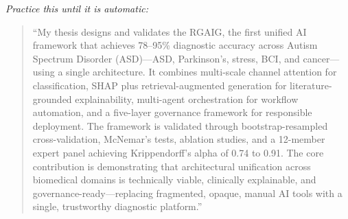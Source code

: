 \noindent\textit{Practice this until it is automatic:}

\begin{quote}
``My thesis designs and validates the RGAIG, the first unified AI framework that achieves 78--95\% diagnostic accuracy across Autism Spectrum Disorder (ASD)---ASD, Parkinson's, stress, BCI, and cancer---using a single architecture. It combines multi-scale channel attention for classification, SHAP plus retrieval-augmented generation for literature-grounded explainability, multi-agent orchestration for workflow automation, and a five-layer governance framework for responsible deployment. The framework is validated through bootstrap-resampled cross-validation, McNemar's tests, ablation studies, and a 12-member expert panel achieving Krippendorff's alpha of 0.74 to 0.91. The core contribution is demonstrating that architectural unification across biomedical domains is technically viable, clinically explainable, and governance-ready---replacing fragmented, opaque, manual AI tools with a single, trustworthy diagnostic platform.''
\end{quote}
